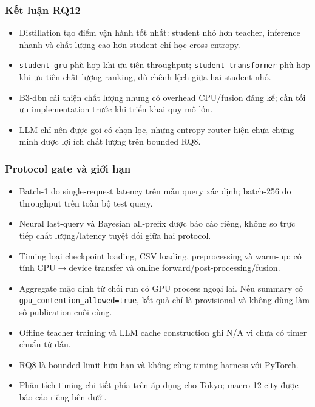 \subsubsection*{Kết luận RQ12}

\begin{itemize}
\item Distillation tạo điểm vận hành tốt nhất: student nhỏ hơn teacher, inference nhanh và chất lượng cao hơn student chỉ học cross-entropy.
\item \texttt{student-gru} phù hợp khi ưu tiên throughput; \texttt{student-transformer} phù hợp khi ưu tiên chất lượng ranking, dù chênh lệch giữa hai student nhỏ.
\item B3-dbn cải thiện chất lượng nhưng có overhead CPU/fusion đáng kể; cần tối ưu implementation trước khi triển khai quy mô lớn.
\item LLM chỉ nên được gọi có chọn lọc, nhưng entropy router hiện chưa chứng minh được lợi ích chất lượng trên bounded RQ8.
\end{itemize}

\subsubsection*{Protocol gate và giới hạn}

\begin{itemize}
\item Batch-1 đo single-request latency trên mẫu query xác định; batch-256 đo throughput trên toàn bộ test query.
\item Neural last-query và Bayesian all-prefix được báo cáo riêng, không so trực tiếp chất lượng/latency tuyệt đối giữa hai protocol.
\item Timing loại checkpoint loading, CSV loading, preprocessing và warm-up; có tính CPU$\rightarrow$device transfer và online forward/post-processing/fusion.
\item Aggregate mặc định từ chối run có GPU process ngoại lai. Nếu summary có \texttt{gpu\_contention\_allowed=true}, kết quả chỉ là provisional và không dùng làm số publication cuối cùng.
\item Offline teacher training và LLM cache construction ghi N/A vì chưa có timer chuẩn từ đầu.
\item RQ8 là bounded limit hữu hạn và không cùng timing harness với PyTorch.
\item Phân tích timing chi tiết phía trên áp dụng cho Tokyo; macro 12-city được báo cáo riêng bên dưới.
\end{itemize}

